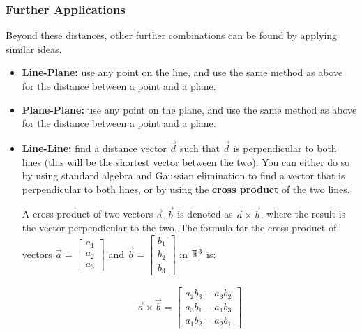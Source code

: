 \documentclass[12pt]{article}
\begin{document}
\subsubsection{Further Applications}

Beyond these distances, other further combinations can be found by applying similar ideas.

\begin{itemize}
    \item \textbf{Line-Plane: } use any point on the line, and use the same method as above for the distance between a point and a plane.
    \item \textbf{Plane-Plane: } use any point on the plane, and use the same method as above for the distance between a point and a plane.
    \item \textbf{Line-Line: } find a distance vector $\vec{d}$ such that $\vec{d}$ is perpendicular to both lines (this will be the shortest vector between the two). You can either do so by using standard algebra and Gaussian elimination to find a vector that is perpendicular to both lines, or by using the \textbf{cross product} of the two lines. 
    
    A cross product of two vectors $\vec{a}, \vec{b}$ is denoted as $\vec{a}\times\vec{b}$, where the result is the vector perpendicular to the two. The formula for the cross product of vectors $\vec{a} = \begin{bmatrix}
        a_1 \\
        a_2 \\
        a_3
    \end{bmatrix}$ and $\vec{b} = \begin{bmatrix}
        b_1 \\
        b_2 \\
        b_3
    \end{bmatrix}$ in $\mathbb{R}^3$ is:

    \begin{equation}
        \begin{split}
            \vec{a}\times\vec{b} = \begin{bmatrix}
                a_2b_3 - a_3b_2 \\
                a_3b_1 - a_1b_3 \\
                a_1b_2 - a_2b_1
            \end{bmatrix}
        \end{split}
    \end{equation}
\end{itemize}
\end{document}
